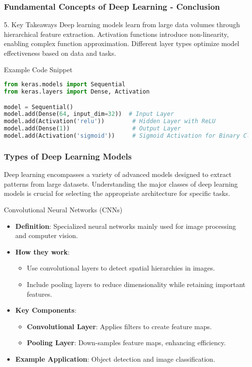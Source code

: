 \documentclass[aspectratio=169]{beamer}
\begin{document}
\begin{frame}[fragile]
    \frametitle{Fundamental Concepts of Deep Learning - Conclusion}
    \begin{block}{5. Key Takeaways}
        Deep learning models learn from large data volumes through hierarchical feature extraction. 
        Activation functions introduce non-linearity, enabling complex function approximation. Different layer types optimize model effectiveness based on data and tasks.
    \end{block}
    
    \begin{block}{Example Code Snippet}
        \begin{lstlisting}[language=Python]
from keras.models import Sequential
from keras.layers import Dense, Activation

model = Sequential()
model.add(Dense(64, input_dim=32))  # Input Layer
model.add(Activation('relu'))        # Hidden Layer with ReLU
model.add(Dense(1))                  # Output Layer
model.add(Activation('sigmoid'))     # Sigmoid Activation for Binary Classification
        \end{lstlisting}
    \end{block}
\end{frame}

\begin{frame}
    \frametitle{Types of Deep Learning Models}
    Deep learning encompasses a variety of advanced models designed to extract patterns from large datasets. Understanding the major classes of deep learning models is crucial for selecting the appropriate architecture for specific tasks.
\end{frame}

\begin{frame}{Convolutional Neural Networks (CNNs)}
    \begin{itemize}
        \item \textbf{Definition}: Specialized neural networks mainly used for image processing and computer vision.
        \item \textbf{How they work}:
        \begin{itemize}
            \item Use convolutional layers to detect spatial hierarchies in images.
            \item Include pooling layers to reduce dimensionality while retaining important features.
        \end{itemize}
        \item \textbf{Key Components}:
        \begin{itemize}
            \item \textbf{Convolutional Layer}: Applies filters to create feature maps.
            \item \textbf{Pooling Layer}: Down-samples feature maps, enhancing efficiency.
        \end{itemize}
        \item \textbf{Example Application}: Object detection and image classification.
    \end{itemize}
\end{frame}
\end{document}
